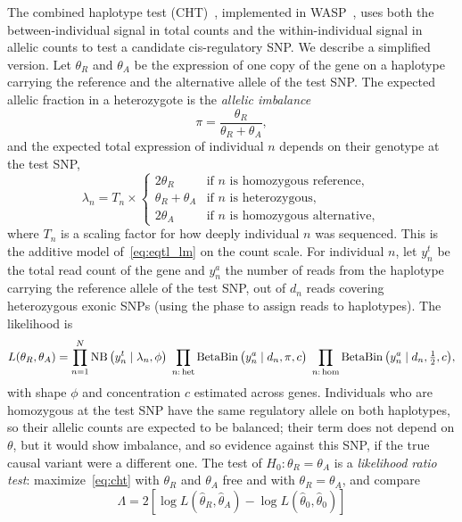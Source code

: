 The combined haplotype test (CHT)~\citep{mcvicker2013}, implemented in WASP~\citep{vandegeijn2015}, uses both the between-individual signal in total counts and the within-individual signal in allelic counts to test a candidate cis-regulatory SNP. We describe a simplified version. Let $\theta_R$ and $\theta_A$ be the expression of one copy of the gene on a haplotype carrying the reference and the alternative allele of the test SNP. The expected allelic fraction in a heterozygote is the \emph{allelic imbalance}
\begin{equation}
  \pi = \frac{\theta_R}{\theta_R+\theta_A},
\end{equation}
and the expected total expression of individual $n$ depends on their genotype at the test SNP,
\begin{equation}
  \lambda_n = T_n\times\begin{cases} 2\theta_R & \text{if $n$ is homozygous reference},\\ \theta_R+\theta_A & \text{if $n$ is heterozygous},\\ 2\theta_A & \text{if $n$ is homozygous alternative}, \end{cases}
\end{equation}
where $T_n$ is a scaling factor for how deeply individual $n$ was sequenced. This is the additive model of~\eqref{eq:eqtl_lm} on the count scale. For individual $n$, let $y^t_n$ be the total read count of the gene and $y^a_n$ the number of reads from the haplotype carrying the reference allele of the test SNP, out of $d_n$ reads covering heterozygous exonic SNPs (using the phase to assign reads to haplotypes). The likelihood is
\begin{equation}
  L(\theta_R,\theta_A) = \prod_{n=1}^N \operatorname{NB}\big(y^t_n\mid\lambda_n,\phi\big)\;\prod_{n:\,\text{het}}\operatorname{BetaBin}\big(y^a_n\mid d_n,\pi,c\big)\;\prod_{n:\,\text{hom}}\operatorname{BetaBin}\big(y^a_n\mid d_n,\tfrac12,c\big),
  \label{eq:cht}
\end{equation}
with shape $\phi$ and concentration $c$ estimated across genes. Individuals who are homozygous at the test SNP have the same regulatory allele on both haplotypes, so their allelic counts are expected to be balanced; their term does not depend on $\theta$, but it would show imbalance, and so evidence against this SNP, if the true causal variant were a different one. The test of $H_0:\theta_R=\theta_A$ is a \emph{likelihood ratio test}: maximize~\eqref{eq:cht} with $\theta_R$ and $\theta_A$ free and with $\theta_R=\theta_A$, and compare
\begin{equation}
  \Lambda = 2\left[\log L(\hat\theta_R,\hat\theta_A) - \log L(\hat\theta_0,\hat\theta_0)\right]
\end{equation}

